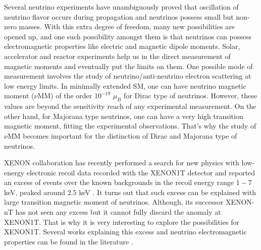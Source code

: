 \documentclass[aps, a4paper,superscriptaddress,12pt,preprintnumbers,floatfix,nofootinbib,amsmath,amssymb]{revtex4}
\begin{document}
Several neutrino experiments have unambiguously proved that oscillation of neutrino flavor occurs during propagation and neutrinos possess small but non-zero masses.  With this extra degree of freedom, many new possibilities are opened up, and  one such possibility amongst them is that neutrinos can possess electromagnetic properties like electric and magnetic dipole moments. Solar, accelerator and reactor experiments help us in the direct measurement of magnetic moments and eventually put the  limits on them. One possible mode of measurement  involves the study of neutrino/anti-neutrino electron scattering at low energy limits. In minimally extended SM, one can have neutrino magnetic moment ($\nu$MM) of the order $10^{-19}$ $\mu_{B}$ for Dirac type of neutrinos. However, these values are beyond the  sensitivity reach of any  experimental measurement. On the other hand, for Majorana type neutrinos,  one can have a very high transition magnetic moment, fitting the experimental observations. That's why the study of $\nu$MM becomes important for the distinction of Dirac and Majorana type of neutrinos.

XENON collaboration has recently performed a search for new physics with low-energy electronic recoil data recorded with the XENON1T detector and reported an excess of events over the known backgrounds in the recoil energy range $1-7$ keV, peaked around $2.5$ keV \cite{XENON:2020rca}. It turns out that such excess can be explained with large transition magnetic moment of neutrinos. Although, its  successor XENON-nT has not seen any excess but it cannot fully discard the anomaly at XENON1T. That is why it is very interesting to explore the possibilities for XENON1T. Several works explaining this excess and neutrino electromagnetic properties can be found in the literature \cite{Miranda:2020kwy, Li:2022bqr, Miranda:2021kre, Babu:2021jnu, Brdar:2020quo, Khan:2022bel, Khan:2022akj, Jeong:2021ivd}.  

\end{document}
